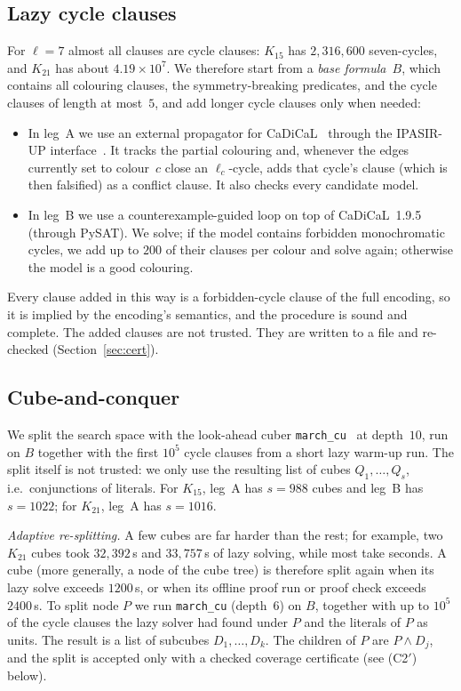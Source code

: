 \documentclass[11pt]{amsart}
\theoremstyle{definition}
\theoremstyle{remark}
\begin{document}
\subsection{Lazy cycle clauses}
For $\ell=7$ almost all clauses are cycle clauses: $K_{15}$ has $2{,}316{,}600$ seven-cycles, and $K_{21}$ has about
$4.19\times10^7$. We therefore start from a \emph{base formula}~$B$, which contains all colouring clauses, the symmetry-breaking
predicates, and the cycle clauses of length at most~$5$, and add longer cycle clauses only when needed:
\begin{itemize}
\item In leg~A we use an external propagator for CaDiCaL~\cite{CaDiCaL2} through the IPASIR-UP interface~\cite{IPASIRUP}. It tracks
the partial colouring and, whenever the edges currently set to colour~$c$ close an $\ell_c$-cycle, adds that cycle's clause (which is
then falsified) as a conflict clause. It also checks every candidate model.
\item In leg~B we use a counterexample-guided loop on top of CaDiCaL~1.9.5 (through PySAT). We solve; if the model contains forbidden
monochromatic cycles, we add up to $200$ of their clauses per colour and solve again; otherwise the model is a good colouring.
\end{itemize}
Every clause added in this way is a forbidden-cycle clause of the full encoding, so it is implied by the encoding's semantics, and
the procedure is sound and complete. The added clauses are not trusted. They are written to a file and re-checked (Section~\ref{sec:cert}).

\subsection{Cube-and-conquer}
We split the search space with the look-ahead cuber \texttt{march\_cu}~\cite{HKWB} at depth~$10$, run on $B$ together with the first
$10^5$ cycle clauses from a short lazy warm-up run. The split itself is not trusted: we only use the resulting list of cubes
$Q_1,\dots,Q_s$, i.e.\ conjunctions of literals. For $K_{15}$, leg~A has $s=988$ cubes and leg~B has $s=1022$; for $K_{21}$, leg~A has $s=1016$.

\emph{Adaptive re-splitting.} A few cubes are far harder than the rest; for example, two $K_{21}$ cubes took $32{,}392$\,s and
$33{,}757$\,s of lazy solving, while most take seconds. A cube (more generally, a node of the cube tree) is therefore split again when its lazy solve exceeds $1200$\,s, or when
its offline proof run or proof check exceeds $2400$\,s. To split node $P$ we run \texttt{march\_cu} (depth~$6$) on $B$, together with up
to $10^5$ of the cycle clauses the lazy solver had found under $P$ and the literals of $P$ as units. The result is a list of subcubes
$D_1,\dots,D_k$. The children of $P$ are $P\wedge D_j$, and the split is accepted only with a checked coverage certificate (see (C2$'$)
below).
\end{document}

